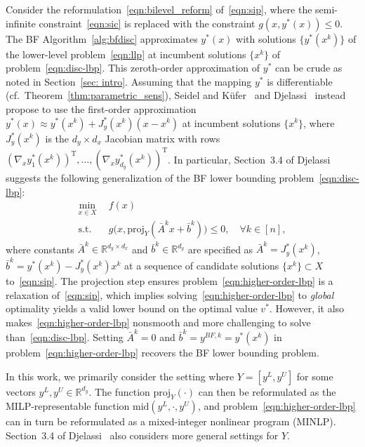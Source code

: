 \documentclass{article}
\newcommand{\tr}[1]{\ensuremath{{#1}^\text{T}}}
\newcommand{\R}{\mathbb{R}}
\newcommand{\1}[1]{\mathds{1}\left[#1\right]}
\begin{document}
Consider the reformulation~\eqref{eqn:bilevel_reform} of~\eqref{eqn:sip}, where the semi-infinite constraint~\eqref{eqn:sic} is replaced with the constraint $g(x,y^*(x)) \leq 0$.
The BF Algorithm~\ref{alg:bfdisc} approximates $y^*(x)$ with solutions $\{y^*(x^k)\}$ of the lower-level problem~\eqref{eqn:llp} at incumbent solutions $\{x^k\}$ of problem~\eqref{eqn:disc-lbp}.
This zeroth-order approximation of $y^*$ can be crude as noted in Section~\ref{sec: intro}.
Assuming that the mapping $y^*$ is differentiable (cf.\
Theorem~\ref{thm:parametric_sens}), Seidel and K{\"u}fer~\cite{seidel2020adaptive} and Djelassi~\cite{djelassi2020discretization} instead propose to use the first-order approximation $y^*(x) \approx y^*(x^k) + J^*_y(x^k) (x - x^k)$ at incumbent solutions $\{x^k\}$, where $J^*_y(x^k)$ is the $d_y \times d_x$ Jacobian matrix with rows $\tr{(\nabla_x y^*_1(x^k))}, \dots, \tr{(\nabla_x y^*_{d_y}(x^k))}$.
In particular, Section~3.4 of Djelassi~\cite{djelassi2020discretization} suggests the following generalization of the BF lower bounding problem~\eqref{eqn:disc-lbp}:
\begin{align}
\label{eqn:higher-order-lbp}
\min_{x \in X} \:\: & f(x) \tag{G-LBP} \\
\text{s.t.} \:\: & g\bigl(x,\text{proj}_Y(\bar{A}^{k} x + \bar{b}^{k})\bigr) \leq 0, \quad \forall k \in [n], \nonumber
\end{align}
where constants $\bar{A}^{k} \in \R^{d_y \times d_x}$ and $\bar{b}^{k} \in \R^{d_y}$ are specified as $\bar{A}^{k} = J^*_y(x^k)$, $\bar{b}^{k} = y^*(x^k) - J^*_y(x^k) x^k$ at a sequence of candidate solutions $\{x^k\} \subset X$  to~\eqref{eqn:sip}.
The projection step ensures problem~\eqref{eqn:higher-order-lbp} is a relaxation of~\eqref{eqn:sip}, which implies solving~\eqref{eqn:higher-order-lbp} to \textit{global} optimality yields a valid lower bound on the optimal value $v^*$.
However, it also makes~\eqref{eqn:higher-order-lbp} nonsmooth and more challenging to solve than~\eqref{eqn:disc-lbp}.
Setting $\bar{A}^{k} = 0$ and $\bar{b}^{k} = y^{BF,k} = y^*(x^k)$ in problem~\eqref{eqn:higher-order-lbp} recovers the BF lower bounding problem.

In this work, we primarily consider the setting where $Y = [y^L, y^U]$ for some vectors $y^L, y^U \in \R^{d_y}$. 
The function $\text{proj}_Y(\cdot)$ can then be reformulated as the MILP-representable function $\text{mid}(y^L, \cdot, y^U)$, and problem~\eqref{eqn:higher-order-lbp} can in turn be reformulated as a mixed-integer nonlinear program (MINLP).
Section~3.4 of Djelassi~\cite{djelassi2020discretization} also considers more general settings for $Y$.
\end{document}
